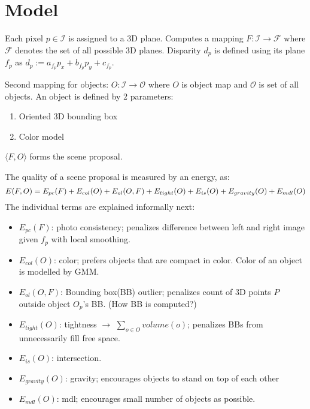 \documentclass[a4paper,12pt]{article}
\begin{document}
\section{Model}
Each pixel $p \in \mathcal{I}$ is assigned to a 3D plane. Computes a mapping $F: \mathcal{I} \rightarrow \mathcal{F}$ where $\mathcal{F}$ denotes the set of all possible 3D planes. Disparity $d_p$ is defined using its plane $f_p$ as $d_p := a_{f_p}p_x+b_{f_p}p_y + c_{f_p}$. 

Second mapping for objects: $O: \mathcal{I} \rightarrow \mathcal{O}$ where $O$ is object map and $\mathcal{O}$ is 
set of all objects. An object is defined by 2 parameters:
\begin{enumerate}
\item Oriented 3D bounding box
\item Color model
\end{enumerate}
$\langle F,O\rangle$ forms the scene proposal.

The quality of a scene proposal is measured by an energy, as:
\begin{equation}
E(F,O) = E_{pc}(F) + E_{col}(O) + E_{ol}(O,F) +\\
E_{tight}(O) + E_{is}(O) + E_{gravity}(O)+E_{mdl}(O)
\end{equation}
The individual terms are explained informally next:
\begin{itemize}
\item $E_{pc}(F)$: photo consistency; penalizes difference between left and right image given $f_p$ with local smoothing.
\item $E_{col}(O)$: color; prefers objects that are compact in color. Color of an object is modelled by GMM.
\item $E_{ol}(O,F)$: Bounding box(BB) outlier; penalizes count of 3D points $P$ outside object $O_p$'s BB. (How BB is computed?)
\item $E_{tight}(O)$: tightness $\rightarrow$ $\sum_{o \in O} volume(o)$; penalizes BBs from unnecessarily fill free space.
\item $E_{is}(O)$: intersection.
\item $E_{gravity}(O)$: gravity; encourages objects to stand on top of each other
\item $E_{mdl}(O)$: mdl; encourages small number of objects as possible.
\end{itemize}
\end{document}
